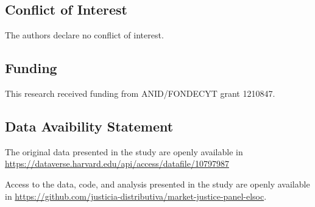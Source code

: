 \documentclass[
  12pt,
  letterpaper,
  DIV=11,
  numbers=noendperiod]{scrartcl}
\begin{document}
\subsection{Conflict of Interest}\label{conflict-of-interest}

The authors declare no conflict of interest.

\subsection{Funding}\label{funding}

This research received funding from ANID/FONDECYT grant 1210847.

\subsection{Data Avaibility Statement}\label{data-avaibility-statement}

The original data presented in the study are openly available in
\url{https://dataverse.harvard.edu/api/access/datafile/10797987}

Access to the data, code, and analysis presented in the study are openly
available in
\url{https://github.com/justicia-distributiva/market-justice-panel-elsoc}.
\end{document}

